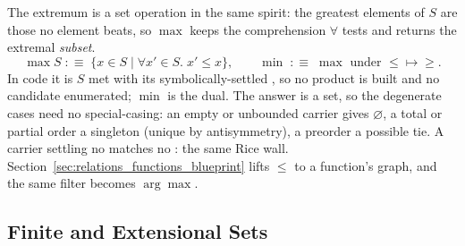 \documentclass[11pt, a4paper]{article}
\begin{document}
The extremum is a set operation in the same spirit: the greatest elements of $S$ are those no element beats, so $\max$ keeps the comprehension $\forall$ tests and returns the extremal \emph{subset}.
\begin{equation}
\label{eqn:extrema}
\max S \;:\equiv\; \{x \in S \mid \forall x' \in S.\; x' \le x\},
\qquad
\min \;:\equiv\; \max \text{ under } {\le} \mapsto {\ge}.
\end{equation}
In code it is $S$ met with its symbolically-settled , so no product is built and no candidate enumerated; $\min$ is the dual.
The answer is a set, so the degenerate cases need no special-casing: an empty or unbounded carrier gives $\varnothing$, a total or partial order a singleton (unique by antisymmetry), a preorder a possible tie.
A carrier settling no  matches no : the same Rice wall.
Section~\ref{sec:relations_functions_blueprint} lifts $\le$ to a function's graph, and the same filter becomes $\arg\max$.

\subsection{Finite and Extensional Sets}
\label{sec:ddk_extensional}
\end{document}
